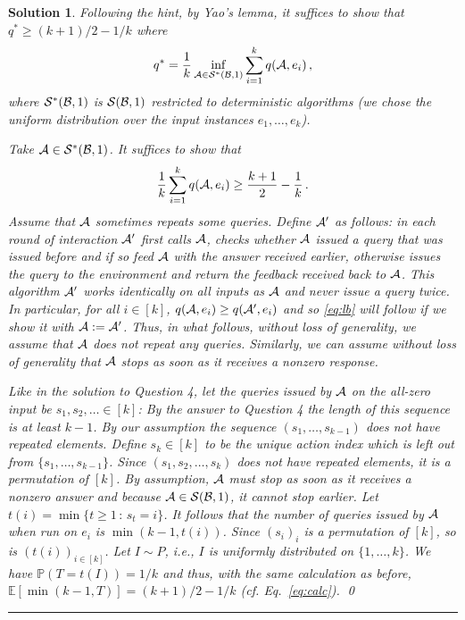 \documentclass{article}
\DeclareMathOperator*{\1}{\mathbbm{1}}
\newcommand{\E}{\mathbb E}
\newcommand{\Prob}[1]{\mathbb{P}( #1 )}
\newcommand{\EE}[1]{\E[#1]}
\newtheorem*{solution*}{Solution}
\begin{document}
\begin{solution*}
Following the hint, by Yao's lemma, it suffices to show that $q^*\ge (k+1)/2-1/k$ where
\begin{align*}
q^*=\frac1k \inf_{\mathcal{A}\in \mathcal{S}^*(\mathcal{B},1)} \sum_{i=1}^k q(\mathcal{A},e_i) \,,
\end{align*}
where $\mathcal{S}^*(\mathcal{B},1)$ is $\mathcal{S}(\mathcal{B},1)$ restricted to deterministic algorithms (we chose the uniform distribution over the input instances $e_1,\dots,e_k$).

Take $\mathcal{A}\in\mathcal{S}^*(\mathcal{B},1)$. 
It suffices to show that 
\begin{align}\label{eq:lb}
\frac1k \sum_{i=1}^k q(\mathcal{A},e_i)  \ge \frac{k+1}{2}-\frac{1}{k}\,.
\end{align}
Assume that $\mathcal{A}$ sometimes repeats some queries.
Define $\mathcal{A}'$ as follows: in each round of interaction $\mathcal{A}'$ first calls $\mathcal{A}$, checks whether $\mathcal{A}$ issued a query that was issued before and if so feed $\mathcal{A}$ with the answer received earlier, otherwise issues the query to the environment and return the feedback received back to $\mathcal{A}$. This algorithm $\mathcal{A}'$  works identically on all inputs as $\mathcal{A}$ and never issue a query twice. In particular, for all $i\in [k]$, $q(\mathcal{A},e_i)\ge q(\mathcal{A}',e_i)$ and so \eqref{eq:lb} will follow if we show it with $\mathcal{A}:=\mathcal{A}'$.
Thus, in what follows, without loss of generality, we assume that $\mathcal{A}$ does not repeat any queries.
Similarly, we can assume without loss of generality that $\mathcal{A}$ stops as soon as it receives a nonzero response.

Like in the solution to Question 4,
let the queries issued by $\mathcal{A}$ on the all-zero input be $s_1,s_2,\dots\in [k]$: 
By the answer to Question 4 the length of this sequence is at least $k-1$.
By our assumption the sequence $(s_1,\dots,s_{k-1})$ does not have repeated elements.
Define $s_k\in [k]$ to be the unique action index which is left out from $\{s_1,\dots,s_{k-1}\}$.
Since  $(s_1,s_2,\dots,s_k)$ does not have repeated elements, it is a permutation of $[k]$.
By assumption, $\mathcal{A}$ must stop as soon as it receives a nonzero answer
and because $\mathcal{A}\in \mathcal{S}(\mathcal{B},1)$, it cannot stop earlier.
Let $t(i) = \min\{ t\ge 1\,:\, s_t=i \}$.
It follows that the number of queries issued by $\mathcal{A}$ when run on $e_i$
 is $\min(k-1,t(i))$. 
Since $(s_i)_i$ is a permutation of $[k]$, so is $(t(i))_{i\in [k]}$.
Let $I\sim P$, i.e., $I$ is uniformly distributed on $\{1,\dots,k\}$.
We have $\Prob{T= t(I)}=1/k$ and thus, with the same calculation as before,
$\EE{\min(k-1,T)} =  (k+1)/2-1/k$ (cf. Eq.~\eqref{eq:calc}).
\qed\par\bigskip\par\hrule
\end{solution*}
\end{document}
